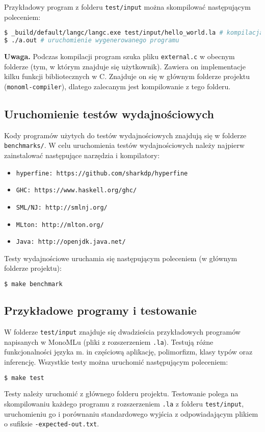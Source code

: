 \documentclass[declaration,shortabstract]{iithesis}
\begin{document}
Przykładowy program z folderu \texttt{test/input} można skompilować następującym 
poleceniem: 
\begin{lstlisting}[language=bash]
$ _build/default/langc/langc.exe test/input/hello_world.la # kompilacja 
$ ./a.out # uruchomienie wygenerowanego programu 
\end{lstlisting}

\textbf{Uwaga.} Podczas kompilacji program szuka pliku \texttt{external.c} w 
obecnym folderze (tym, w którym znajduje się użytkownik). Zawiera on  
implementacje kilku funkcji bibliotecznych w C. Znajduje on się w 
głównym folderze projektu \newline(\texttt{monoml-compiler}), dlatego 
zalecanym jest kompilowanie z tego folderu.

\subsection{Uruchomienie testów wydajnościowych}
Kody programów użytych do testów wydajnościowych znajdują się w folderze 
\texttt{benchmarks/}. W celu uruchomienia testów wydajnościowych należy najpierw 
zainstalować następujące narzędzia i kompilatory:

\begin{itemize}
  \item \texttt{hyperfine: https://github.com/sharkdp/hyperfine}
  \item \texttt{GHC: https://www.haskell.org/ghc/}
  \item \texttt{SML/NJ: http://smlnj.org/}
  \item \texttt{MLton: http://mlton.org/}
  \item \texttt{Java: http://openjdk.java.net/} 
\end{itemize}

Testy wydajnościowe uruchamia się następującym poleceniem (w głównym folderze 
projektu):
\begin{lstlisting}[language=bash]
$ make benchmark
\end{lstlisting}

\subsection{Przykładowe programy i testowanie}

W folderze \texttt{test/input} znajduje się dwadzieścia przykładowych programów
napisanych w MonoMLu (pliki z rozszerzeniem \texttt{.la}). Testują różne funkcjonalności języka m. in 
częściową aplikację, polimorfizm, klasy typów oraz inferencję. 
Wszystkie testy można uruchomić następującym poleceniem:
\begin{lstlisting}[language=bash]
$ make test
\end{lstlisting}
Testy należy uruchomić z głównego folderu projektu.
Testowanie polega na skompilowaniu każdego programu z rozszerzeniem \texttt{.la}
z folderu \texttt{test/input}, uruchomieniu go i porównaniu standardowego 
wyjścia z odpowiadającym plikiem o sufiksie \texttt{-expected-out.txt}.
\end{document}
